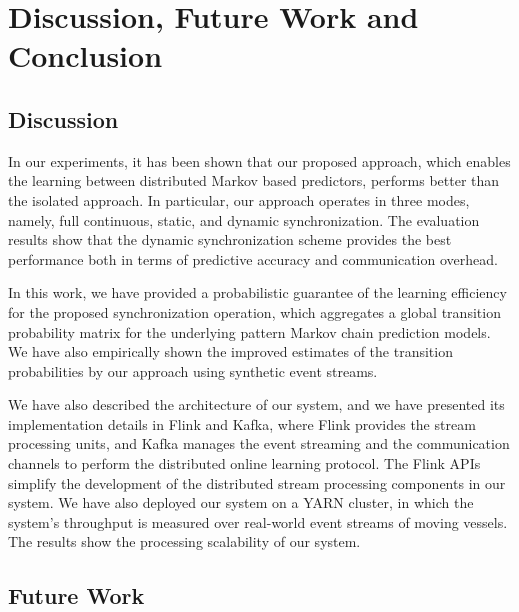 
\chapter{Discussion, Future Work and Conclusion}
\label{chap:conclusions}


\section{Discussion}

\par In our experiments, it has been shown that our proposed approach, which enables the learning between distributed Markov based predictors, performs better than the isolated approach. In particular, our approach operates in three modes, namely, full continuous, static, and dynamic synchronization. The evaluation results show that the dynamic synchronization scheme provides the best performance both in terms of predictive accuracy and communication overhead.


\par In this work, we have provided a probabilistic guarantee of the learning efficiency for the proposed synchronization operation, which aggregates a global transition probability matrix for the underlying pattern Markov chain prediction models. We have also empirically shown the improved estimates of the transition probabilities by our approach using synthetic event streams.  


\par We have also described the architecture of our system, and we have presented its implementation details in Flink and Kafka, where Flink provides the stream processing units, and Kafka manages the event streaming and the communication channels to perform the distributed online learning protocol. The Flink APIs simplify the development of the distributed stream processing components in our system. We have also deployed our system on a YARN cluster, in which the  system's throughput is measured over real-world event streams of moving vessels. The results show the processing scalability of our system.  




\section{Future Work}

